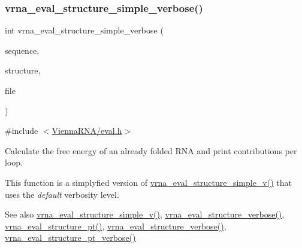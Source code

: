 \subsubsection{\texorpdfstring{vrna\+\_\+eval\+\_\+structure\+\_\+simple\+\_\+verbose()}{vrna\_eval\_structure\_simple\_verbose()}}
{\footnotesize\ttfamily int vrna\+\_\+eval\+\_\+structure\+\_\+simple\+\_\+verbose (\begin{DoxyParamCaption}\item[{const char $\ast$}]{sequence,  }\item[{const char $\ast$}]{structure,  }\item[{F\+I\+LE $\ast$}]{file }\end{DoxyParamCaption})}



{\ttfamily \#include $<$\hyperlink{eval_8h}{Vienna\+R\+N\+A/eval.\+h}$>$}



Calculate the free energy of an already folded R\+NA and print contributions per loop. 

This function is a simplyfied version of \hyperlink{group__eval_gacd6278343e77d13f1d53588e50d303bc}{vrna\+\_\+eval\+\_\+structure\+\_\+simple\+\_\+v()} that uses the {\itshape default} verbosity level.

\begin{DoxySeeAlso}{See also}
\hyperlink{group__eval_gacd6278343e77d13f1d53588e50d303bc}{vrna\+\_\+eval\+\_\+structure\+\_\+simple\+\_\+v()}, \hyperlink{group__eval_ga0928d699d310178f84ee2351034e5cb5}{vrna\+\_\+eval\+\_\+structure\+\_\+verbose()}, \hyperlink{group__eval_gadbd09372ddfd7a450bbd590c96a6bfe4}{vrna\+\_\+eval\+\_\+structure\+\_\+pt()}, \hyperlink{group__eval_ga0928d699d310178f84ee2351034e5cb5}{vrna\+\_\+eval\+\_\+structure\+\_\+verbose()}, \hyperlink{group__eval_ga8a517cfeeae8c376ae7b1e0c401d38b4}{vrna\+\_\+eval\+\_\+structure\+\_\+pt\+\_\+verbose()}
\end{DoxySeeAlso}

